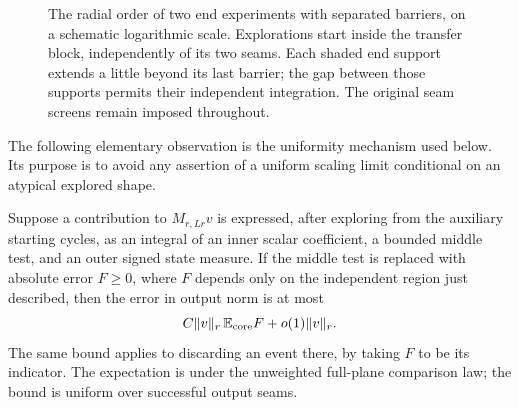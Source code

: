 \begin{figure}[tb]
\centering
{}
\caption{The radial order of two end experiments with separated barriers,
on a schematic logarithmic scale.  Explorations start inside the transfer
block, independently of its two seams.  Each shaded end support extends
a little beyond its last barrier; the gap between those supports permits
their independent integration.  The original seam screens remain
imposed throughout.}
\label{tr:figure}
\end{figure}

The following elementary observation is the uniformity mechanism used
below.  Its purpose is to avoid any assertion of a uniform scaling
limit conditional on an atypical explored shape.

\begin{lemma}
\label{tr:domination}
Suppose a contribution to $M_{r,Lr}v$ is expressed, after exploring from
the auxiliary starting cycles, as an integral of an inner scalar
coefficient, a bounded middle test, and an outer signed state measure.
If the middle test is replaced with absolute error $F\ge0$, where $F$
depends only on the independent region just described, then the error
in output norm is at most
\begin{equation}
              C\|v\|_r\,\mathbb E_{\mathrm{core}}F+o(1)\|v\|_r.
\label{tr:domination-bound}
\end{equation}
The same bound applies to discarding an event there, by taking $F$ to
be its indicator.  The expectation is under the unweighted full-plane
comparison law; the bound is uniform over successful output seams.
\end{lemma}

